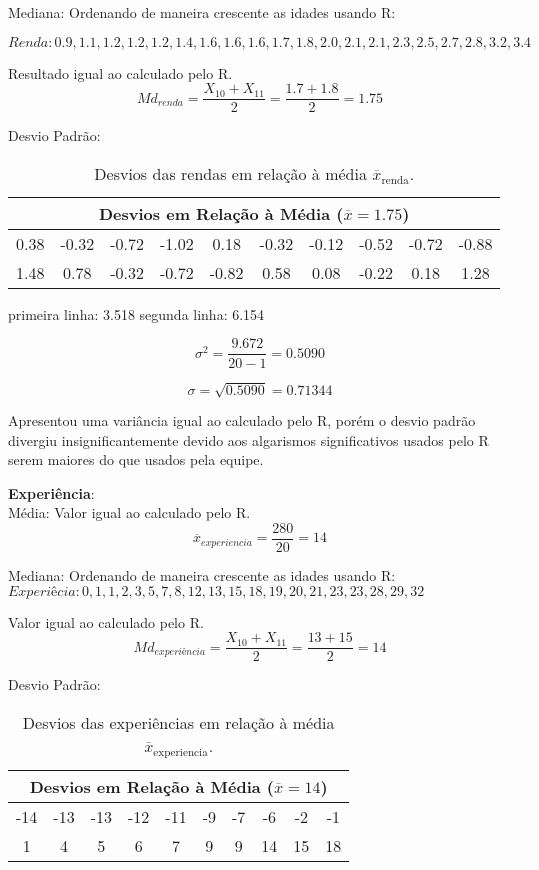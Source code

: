 \documentclass[a4paper,11pt]{article}
\begin{document}
\begin{description}[leftmargin=*]
Mediana:
Ordenando de maneira crescente as idades usando R:

$Renda: 0.9, 1.1, 1.2, 1.2, 1.2, 1.4, 1.6, 1.6, 1.6, 1.7, 1.8, 2.0, 2.1, 2.1, 2.3, 2.5, 2.7, 2.8, 3.2, 3.4$

Resultado igual ao calculado pelo R.
\[Md_{renda} = \frac{X_{10}+X_{11}}{2} = \frac{1.7+1.8}{2} = 1.75\]

Desvio Padrão:

\begin{table}[H]
    \centering
    \begin{tabular}{cccccccccc}
        \hline
        \multicolumn{10}{c}{\textbf{Desvios em Relação à Média ($\overline{x} = 1.75$)}}\\
        \hline
        0.38 & -0.32 & -0.72 & -1.02 & 0.18 & -0.32 & -0.12 & -0.52 & -0.72 & -0.88 \\ 
         1.48 & 0.78 & -0.32 & -0.72 & -0.82 & 0.58 & 0.08 & -0.22 & 0.18 & 1.28 \\
        \hline
    \end{tabular}
    \caption{Desvios das rendas em relação à média $\overline{x}_{\text{renda}}$.}
    \label{tab:desvios_renda}
\end{table}

primeira linha: 3.518
segunda linha: 6.154

\[\sigma^2 = \frac{ 9.672}{20-1} = 0.5090\]

\[\sigma = \sqrt{0.5090} = 0.71344\]

Apresentou uma variância igual ao calculado pelo R, porém o desvio padrão divergiu insignificantemente devido aos algarismos significativos usados pelo R serem maiores do que usados pela equipe.


\item \textbf{Experiência}:\\
Média:
Valor igual ao calculado pelo R.
\[\overline{x}_{experiencia} = \frac{280}{20} = 14\]

Mediana:
Ordenando de maneira crescente as idades usando R: \\
$Experiêcia: 0,  1,  1,  2,  3,  5,  7,  8, 12, 13, 15, 18, 19, 20, 21, 23, 23, 28, 29, 32$

Valor igual ao calculado pelo R.
\[Md_{experiência} = \frac{X_{10}+X_{11}}{2} = \frac{13+15}{2} = 14\]


Desvio Padrão:

\begin{table}[H]
    \centering
    \begin{tabular}{cccccccccc}
        \hline
        \multicolumn{10}{c}{\textbf{Desvios em Relação à Média ($\overline{x} = 14$)}}\\
        \hline
        -14 & -13 & -13 & -12 & -11 & -9 & -7 & -6 & -2 & -1 \\ 
         1 & 4 & 5 & 6 & 7 & 9 & 9 & 14 & 15 & 18 \\
        \hline
    \end{tabular}
    \caption{Desvios das experiências em relação à média $\overline{x}_{\text{experiencia}}$.}
    \label{tab:desvios_experiencia}
\end{table}



\end{description}
\end{document}
